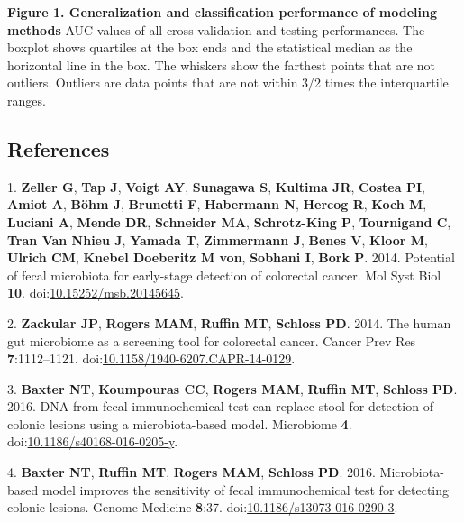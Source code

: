 \documentclass[11pt,]{article}
\begin{document}
\newpage

\textbf{Figure 1. Generalization and classification performance of
modeling methods } AUC values of all cross validation and testing
performances. The boxplot shows quartiles at the box ends and the
statistical median as the horizontal line in the box. The whiskers show
the farthest points that are not outliers. Outliers are data points that
are not within 3/2 times the interquartile ranges.

\newpage

\subsection{References}\label{references}

\hypertarget{refs}{}
\hypertarget{ref-zeller_potential_2014}{}
1. \textbf{Zeller G}, \textbf{Tap J}, \textbf{Voigt AY},
\textbf{Sunagawa S}, \textbf{Kultima JR}, \textbf{Costea PI},
\textbf{Amiot A}, \textbf{Böhm J}, \textbf{Brunetti F},
\textbf{Habermann N}, \textbf{Hercog R}, \textbf{Koch M},
\textbf{Luciani A}, \textbf{Mende DR}, \textbf{Schneider MA},
\textbf{Schrotz-King P}, \textbf{Tournigand C}, \textbf{Tran Van Nhieu
J}, \textbf{Yamada T}, \textbf{Zimmermann J}, \textbf{Benes V},
\textbf{Kloor M}, \textbf{Ulrich CM}, \textbf{Knebel Doeberitz M von},
\textbf{Sobhani I}, \textbf{Bork P}. 2014. Potential of fecal microbiota
for early-stage detection of colorectal cancer. Mol Syst Biol
\textbf{10}.
doi:\href{https://doi.org/10.15252/msb.20145645}{10.15252/msb.20145645}.

\hypertarget{ref-zackular_human_2014}{}
2. \textbf{Zackular JP}, \textbf{Rogers MAM}, \textbf{Ruffin MT},
\textbf{Schloss PD}. 2014. The human gut microbiome as a screening tool
for colorectal cancer. Cancer Prev Res \textbf{7}:1112--1121.
doi:\href{https://doi.org/10.1158/1940-6207.CAPR-14-0129}{10.1158/1940-6207.CAPR-14-0129}.

\hypertarget{ref-baxter_dna_2016}{}
3. \textbf{Baxter NT}, \textbf{Koumpouras CC}, \textbf{Rogers MAM},
\textbf{Ruffin MT}, \textbf{Schloss PD}. 2016. DNA from fecal
immunochemical test can replace stool for detection of colonic lesions
using a microbiota-based model. Microbiome \textbf{4}.
doi:\href{https://doi.org/10.1186/s40168-016-0205-y}{10.1186/s40168-016-0205-y}.

\hypertarget{ref-baxter_microbiota-based_2016}{}
4. \textbf{Baxter NT}, \textbf{Ruffin MT}, \textbf{Rogers MAM},
\textbf{Schloss PD}. 2016. Microbiota-based model improves the
sensitivity of fecal immunochemical test for detecting colonic lesions.
Genome Medicine \textbf{8}:37.
doi:\href{https://doi.org/10.1186/s13073-016-0290-3}{10.1186/s13073-016-0290-3}.
\end{document}

